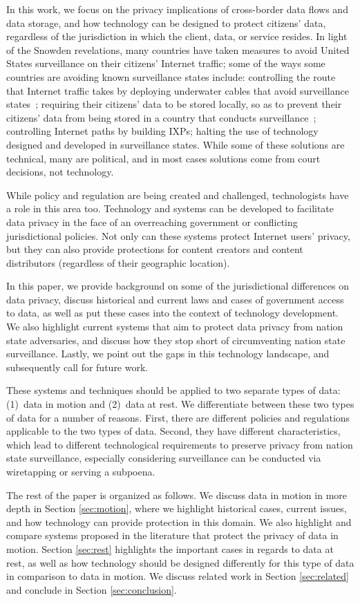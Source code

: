 In this work, we focus on the privacy implications of cross-border data flows
and data  storage, and how technology can be designed to protect citizens'
data, regardless of the  jurisdiction in which the client, data, or service
resides.  In light of  the Snowden revelations, many countries have taken
measures to avoid United States surveillance on their citizens' Internet
traffic; some of  the ways some countries are avoiding known surveillance
states include: controlling the route  that Internet traffic takes by
deploying underwater cables that avoid surveillance states~\cite{brazil};
requiring their citizens' data to be stored locally, so as to prevent their
citizens' data from  being stored in a country that conducts
surveillance~\cite{russia}; controlling Internet paths by building  IXPs;
halting the use of technology designed and developed in surveillance states.
While some of these  solutions are technical, many are political, and in most
cases solutions come from court decisions, not  technology.

While policy and regulation are being created and challenged, technologists
have a role  in this area too.  Technology and systems can be developed to
facilitate data privacy in the  face of an overreaching government or
conflicting jurisdictional policies.  Not only can  these systems protect
Internet users' privacy, but they can also provide protections  for content
creators and content distributors (regardless of their geographic location).

In this paper, we provide background on some of the jurisdictional differences
on data privacy, discuss historical and current laws
and cases of  government access to data, as well as
put these cases into the context  of technology development. We also highlight
current systems that aim to protect data privacy from nation  state
adversaries, and discuss how they stop short of circumventing nation state
surveillance.  Lastly, we  point out the gaps in this technology landscape,
and  subsequently call for future work.

These systems and techniques should be applied to two separate types of data:
(1)~data in motion and (2)~data at rest.  We differentiate between these two
types of data for a number of reasons.   First, there are different policies
and regulations applicable to the two types of data.  Second,  they have
different characteristics, which lead to different technological requirements
to preserve  privacy from nation state surveillance, especially considering
 surveillance can be conducted via wiretapping or serving a subpoena.

The rest of the paper is organized as follows.  We discuss data in motion in
more depth in Section \ref{sec:motion}, where we highlight  historical cases,
current issues, and how technology can provide protection in this domain.  We
also highlight and compare systems proposed in the literature that protect the
privacy of data in motion. Section \ref{sec:rest} highlights the important
cases in regards to data at rest, as well as how technology should be designed
differently for this type of data in comparison to data in motion.  We discuss
related work in Section \ref{sec:related} and  conclude in Section
\ref{sec:conclusion}.
